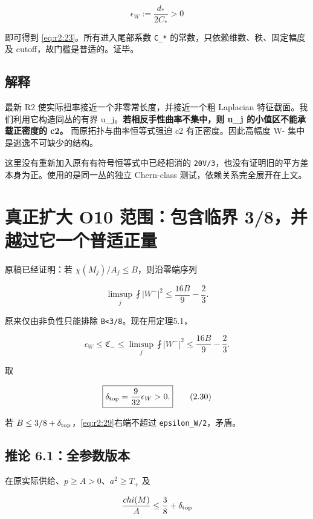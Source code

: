 \documentclass[UTF8,11pt,fontset=none]{ctexart}
\begin{document}
\[
 \epsilon_W:=\frac{d_*}{2C_*}>0
\]

即可得到 \eqref{eq:r2:23}。所有进入尾部系数 \texttt{C\_*} 的常数，只依赖维数、秩、固定幅度及 cutoff，故门槛是普适的。证毕。

\subsection{解释}\label{ch2:ux89e3ux91ca}

最新 R2 使实际扭率接近一个非零常长度，并接近一个粗 Laplacian 特征截面。我们利用它构造同丛的有界 u\_j。\textbf{若相反手性曲率不集中，则 u\_j 的小值区不能承载正密度的 c2。} 而原拓扑与曲率恒等式强迫 c2 有正密度。因此高幅度 W- 集中是逃逸不可缺少的结构。

这里没有重新加入原有有符号恒等式中已经相消的 \texttt{20V/3}，也没有证明旧的平方差本身为正。使用的是同一丛的独立 Chern-class 测试，依赖关系完全展开在上文。

\section{真正扩大 O10 范围：包含临界 3/8，并越过它一个普适正量}\label{ch2:ux771fux6b63ux6269ux5927-o10-ux8303ux56f4ux5305ux542bux4e34ux754c-38ux5e76ux8d8aux8fc7ux5b83ux4e00ux4e2aux666eux9002ux6b63ux91cf}

原稿已经证明：若 \(\chi(M_j)/A_j\le B\)，则沿零端序列

\[
 \limsup_j\fint|W^-|^2\le\frac{16B}{9}-\frac23.
 \tag{2.28}\label{eq:r2:28}
\]

原来仅由非负性只能排除 \texttt{B\textless{}3/8}。现在用定理5.1，

\[
 \epsilon_W\le\mathfrak C_-
 \le\limsup_j\fint|W^-|^2
 \le\frac{16B}{9}-\frac23.
 \tag{2.29}\label{eq:r2:29}
\]

取

\[
 \boxed{\delta_{\rm top}=\frac9{32}\epsilon_W>0.}
 \tag{2.30}\label{eq:r2:30}
\]

若 \(B\le3/8+\delta_{\rm top}\)，\eqref{eq:r2:29}右端不超过 \texttt{epsilon\_W/2}，矛盾。

\subsection{推论 6.1：全参数版本}\label{ch2:ux63a8ux8bba-6.1ux5168ux53c2ux6570ux7248ux672c}

在原实际供给、\(p\ge A>0\)、\(a^2\ge T_+\) 及

\[
 \frac{\chi(M)}A\le\frac38+\delta_{\rm top}
\]
\end{document}
